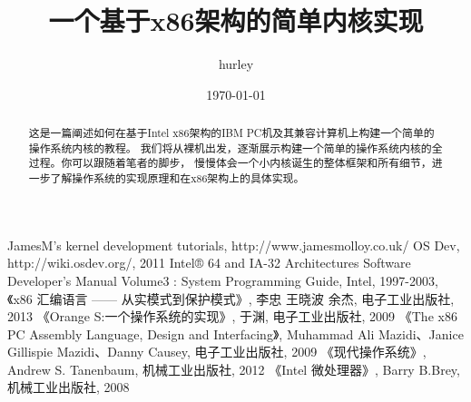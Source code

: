 \documentclass[11pt, a4paper]{article}
\title{一个基于x86架构的简单内核实现}
\author{hurley}
\date{\today}
\begin{document}
\maketitle

\begin{abstract}
这是一篇阐述如何在基于Intel x86架构的IBM PC机及其兼容计算机上构建一个简单的操作系统内核的教程。\allowbreak
我们将从裸机出发，逐渐展示构建一个简单的操作系统内核的全过程。你可以跟随着笔者的脚步，\allowbreak
慢慢体会一个小内核诞生的整体框架和所有细节，进一步了解操作系统的实现原理和在x86架构上的具体实现。\allowbreak
\end{abstract}

\clearpage

\tableofcontents















\begin{thebibliography}{99}
	 {JamesM's kernel development tutorials}, {http://www.jamesmolloy.co.uk/}
	 {OS Dev}, {http://wiki.osdev.org/}, {2011}
	 {Intel® 64 and IA-32 Architectures Software Developer’s Manual Volume3 : System Programming Guide},
		{Intel}, {1997-2003},
	 {《x86 汇编语言 —— 从实模式到保护模式》}, {李忠 王晓波 余杰},
		 {电子工业出版社}, {2013}
	 {《Orange S:一个操作系统的实现》}, {于渊}, {电子工业出版社}, {2009}
	 {《The x86 PC Assembly Language, Design and Interfacing》},
		{Muhammad Ali Mazidi、Janice Gillispie Mazidi、Danny Causey}, {电子工业出版社}, {2009}
	 {《现代操作系统》}, {Andrew S. Tanenbaum}, {机械工业出版社}, {2012}
	 {《Intel 微处理器》}, {Barry B.Brey}, {机械工业出版社}, {2008}
\end{thebibliography}
\end{document}
